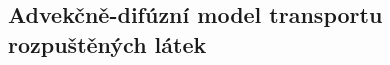 \def\abs#1{\lvert#1\rvert}
\def\argdot{{\hspace{0.18em}\cdot\hspace{0.18em}}}
\def\avg#1{\left\{#1\right\}_\omega}
\def\D{{\tn D}}
\def\div{\operatorname{div}}
\def\Eh{\mathcal E_h}       %
\def\Ehcom{\mathcal E_{h,C}}         %
\def\Ehdir{\mathcal E_{h,D}}         %
\def\Ehint{\mathcal E_{h,I}}       %
\def\grad{\nabla}
\def\jmp#1{[#1]}
\def\n{\vc n}
\def\vc#1{\mathbf{\boldsymbol{#1}}}     %
\def\R{\mathbb R}
\def\sc#1#2{\left(#1,#2\right)}
\def\Th{\mathcal T_h}       %
\def\th{\vartheta}
\def\tn#1{{\mathbb{#1}}}    %
\def\Tr{\operatorname{Tr}}
\def\where{\,|\,}


\subsection{Advekčně-difúzní model transportu rozpuštěných látek}
\label{sc:transport_model}

